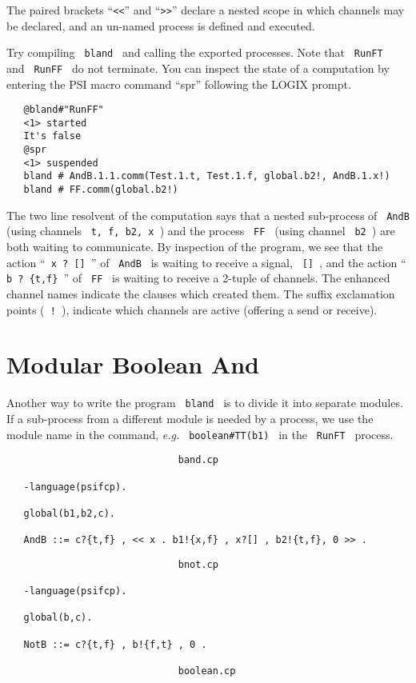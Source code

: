 \noindent
The paired brackets ``\verb+<<+'' and ``\verb+>>+'' declare
a nested scope in which channels may be declared, and an
un-named process is defined and executed.

\noindent
Try compiling \verb+ bland + and calling the exported processes.
Note that \verb+ RunFT + and \verb+ RunFF + do not terminate.  You
can inspect the state of a computation by entering the PSI macro command
``spr'' following the LOGIX prompt.

\begin{verbatim}
   @bland#"RunFF"
   <1> started
   It's false
   @spr
   <1> suspended
   bland # AndB.1.1.comm(Test.1.t, Test.1.f, global.b2!, AndB.1.x!)
   bland # FF.comm(global.b2!)
\end{verbatim}

\noindent
The two line resolvent of the computation says that a nested sub-process of
\verb+ AndB + (using channels \verb+ t, f, b2, x +) and the process
\verb+ FF + (using channel \verb+ b2 +) are both waiting to communicate.
By inspection of the program, we see that the action ``\verb+ x ? [] +''
of \verb+ AndB + is waiting to receive a signal, \verb+ [] +, and the
action ``\verb+ b ? {t,f} +'' of \verb+ FF + is waiting to receive a
2-tuple of channels.  The enhanced channel names indicate the clauses
which created them.  The suffix exclamation points (\verb+ ! +),
indicate which channels are active (offering a send or receive).

\section{Modular Boolean And}
\label{mbland}
Another way to write the program \verb+ bland + is to divide it
into separate modules. If a sub-process from a different module is
needed by a process, we use the module name in the command, {\em e.g.}
\verb+ boolean#TT(b1) + in the \verb+ RunFT + process.

\begin{verbatim}
                              band.cp

   -language(psifcp).

   global(b1,b2,c).

   AndB ::= c?{t,f} , << x . b1!{x,f} , x?[] , b2!{t,f}, 0 >> .
\end{verbatim}

\begin{verbatim}
                              bnot.cp

   -language(psifcp).

   global(b,c).

   NotB ::= c?{t,f} , b!{f,t} , 0 .

                              boolean.cp
\end{verbatim}

